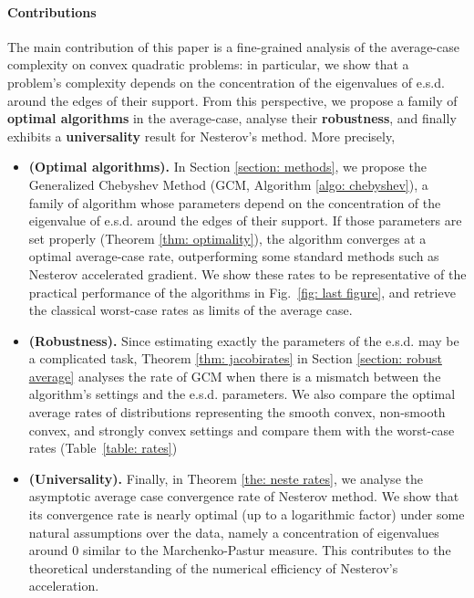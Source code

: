 \documentclass{article}
\begin{document}



\paragraph{Contributions} The main contribution of this paper is a fine-grained analysis of the average-case complexity on convex quadratic problems: in particular, we show that a problem's complexity depends on the concentration of the eigenvalues of e.s.d. around the edges of their support. From this perspective, we propose a family of \textbf{optimal algorithms} in the average-case, analyse their \textbf{robustness}, and finally exhibits a \textbf{universality} result for Nesterov's method. More precisely,
\begin{itemize}
    \item \textbf{(Optimal algorithms).} In Section \ref{section: methods}, we propose the Generalized Chebyshev Method (GCM, Algorithm \ref{algo: chebyshev}), a family of algorithm whose parameters depend on the concentration of the eigenvalue of e.s.d. around the edges of their support. If those parameters are set properly (Theorem \ref{thm: optimality}), the algorithm converges at a optimal average-case rate, outperforming some standard methods such as Nesterov accelerated gradient. We show these rates to be representative of the practical performance of the algorithms in Fig.~\ref{fig: last figure}, and retrieve the classical worst-case rates as limits of the average case.
    \item \textbf{(Robustness).} Since estimating exactly the parameters of the e.s.d. may be a complicated task, Theorem \ref{thm: jacobirates} in Section \ref{section: robust average} analyses the rate of GCM when there is a mismatch between the algorithm's settings and the e.s.d. parameters. We also compare the optimal average rates of distributions representing the smooth convex, non-smooth convex, and strongly convex settings and compare them with the worst-case rates (Table~\ref{table: rates})
    \item \textbf{(Universality).} Finally, in Theorem \ref{the: neste rates}, we analyse the  asymptotic average case convergence rate of Nesterov method. We show that its convergence rate is nearly optimal (up to a logarithmic factor) under some natural assumptions over the data, namely a concentration of eigenvalues around $0$ similar to the Marchenko-Pastur measure. This contributes to the theoretical understanding of the numerical efficiency of Nesterov's acceleration.
\end{itemize}
\end{document}
